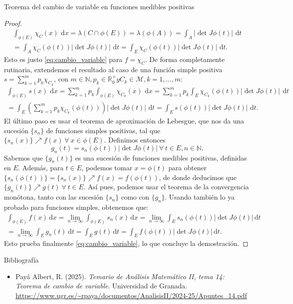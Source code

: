 \documentclass{article}
\begin{document}
\begin{section}{Teorema del cambio de variable en funciones medibles positivas}
\begin{proof}
\begin{multline*}
\int_{\phi(E)} \chi_C(x)\,\, \mathrm{d}x = \lambda(C \cap \phi(E)) = \lambda(\phi(A)) = \int_A \lvert \det J\phi(t) \rvert\,\, \mathrm{d}t \\
= \int_A \chi_C(\phi(t)) \lvert \det J\phi(t) \rvert\,\, \mathrm{d}t = \int_E \chi_C(\phi(t)) \lvert \det J\phi(t) \rvert\,\, \mathrm{d}t.
\end{multline*}
Esto es justo \eqref{eq:cambio_variable} para $f = \chi_C$.
De forma completamente rutinaria, extendemos el resultado al caso de una función simple positiva $s = \sum_{k=1}^m p_k\chi_{C_k}$, con $m \in \mathbb{N}, p_k \in \mathbb{R}_0^+ y C_k \in \mathcal{M}, k = 1, \dots, m$:
\begin{multline*}
\int_{\phi(E)} s(x)\,\, \mathrm{d}x = \sum_{k=1}^m p_k \int_{\phi(E)} \chi_{C_k}(x)\,\, \mathrm{d}x = \sum_{k=1}^m p_k \int_E \chi_{C_k}(\phi(t)) \lvert \det J\phi(t) \rvert\,\ \mathrm{d}t \\
= \int_E \left(\sum_{k=1}^m p_k \chi_{C_k}(\phi(t))\right) \lvert \det J\phi(t) \rvert\,\, \mathrm{d}t = \int_E s(\phi(t)) \lvert \det J\phi(t) \rvert\,\, \mathrm{d}t.
\end{multline*}
El último paso es usar el teorema de aproximación de Lebesgue, que nos da una sucesión $\{s_n\}$ de funciones simples positivas, tal que $\{s_n(x)\}\nearrow f(x) \ \forall \ x \in \phi(E)$. Definimos entonces
\[
g_n(t) = s_n(\phi(t)) \lvert \det J\phi(t) \rvert \ \forall \ t \in E, n \in \mathbb{N}.
\]
Sabemos que $\{g_n(t)\}$ es una sucesión de funciones medibles positivas, definidas en $E$. Además, para $t \in E$, podemos tomar $x = \phi(t)$ para obtener $\{s_n(\phi(t))\} = \{s_n(x)\} \nearrow f(x) = f(\phi(t))$, de donde deducimos que $\{g_n(t)\} \nearrow g(t) \ \forall \ t \in E$. Así pues, podemos usar el teorema de la convergencia monótona, tanto con las sucesión $\{s_n\}$ como con $\{g_n\}$. Usando también lo ya probado para funciones simples, obtenemos que:
\begin{multline*}
\int_{\phi(E)}f(x)\, \mathrm{d} x = \lim_{n\to \infty}\int_{\phi(E)}s_n(x)\, \mathrm{d}x = \lim_{n\to \infty}\int_E s_n(\phi(t)) \lvert \det J\phi(t) \rvert\, \mathrm{d}t \\
= \lim_{n\to \infty}\int_E g_n(t)\ \mathrm{d}t = \int_E g(t)\, \mathrm{d}t = \int_E f(\phi(t)) \lvert \det J\phi(t) \rvert\, \mathrm{d}t.
\end{multline*}
Esto prueba finalmente \eqref{eq:cambio_variable}, lo que concluye la demostración.
\end{proof}
\end{section}
\begin{section}{Bibliografía}
\begin{itemize}
    \item Payá Albert, R. (2025). \textit{Temario de Análisis Matemático II, tema 14: Teorema de cambio de variable}. Universidad de Granada. \url{https://www.ugr.es/~rpaya/documentos/AnalisisII/2024-25/Apuntes_14.pdf}
\end{itemize}
\end{section}
\end{document}
